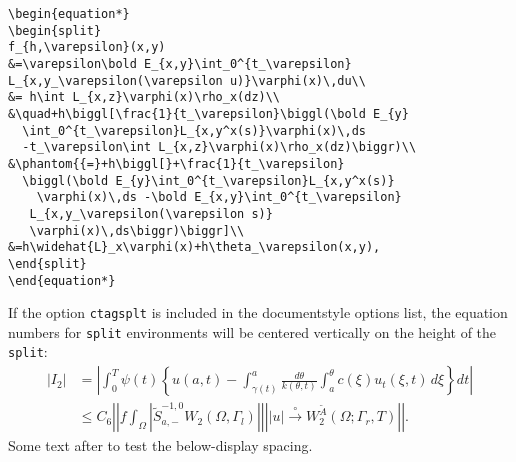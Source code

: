 \begin{verbatim}
\begin{equation*}
\begin{split}
f_{h,\varepsilon}(x,y)
&=\varepsilon\bold E_{x,y}\int_0^{t_\varepsilon}
L_{x,y_\varepsilon(\varepsilon u)}\varphi(x)\,du\\
&= h\int L_{x,z}\varphi(x)\rho_x(dz)\\
&\quad+h\biggl[\frac{1}{t_\varepsilon}\biggl(\bold E_{y}
  \int_0^{t_\varepsilon}L_{x,y^x(s)}\varphi(x)\,ds
  -t_\varepsilon\int L_{x,z}\varphi(x)\rho_x(dz)\biggr)\\
&\phantom{{=}+h\biggl[}+\frac{1}{t_\varepsilon}
  \biggl(\bold E_{y}\int_0^{t_\varepsilon}L_{x,y^x(s)}
    \varphi(x)\,ds -\bold E_{x,y}\int_0^{t_\varepsilon}
   L_{x,y_\varepsilon(\varepsilon s)}
   \varphi(x)\,ds\biggr)\biggr]\\
&=h\widehat{L}_x\varphi(x)+h\theta_\varepsilon(x,y),
\end{split}
\end{equation*}
\end{verbatim}

\newpage
If the option {\tt ctagsplt} is included in the documentstyle options
list, the equation numbers for {\tt split} environments will be
centered vertically on the height
of  the {\tt split}:
{\makeatletter\ctagsplit@true
\begin{equation}
\begin{split}
 |I_2|&=\left|\int_{0}^T \psi(t)\left\{u(a,t)-\int_{\gamma(t)}^a
  \frac{d\theta}{k(\theta,t)}
  \int_{a}^\theta c(\xi)u_t(\xi,t)\,d\xi\right\}dt\right|\\
&\le C_6\left|\left|f\int_\Omega\left|\widetilde{S}^{-1,0}_{a,-}
  W_2(\Omega,\Gamma_l)\right|\right|
  \left||u|\overset{\circ}\to W_2^{\widetilde{A}}
  (\Omega;\Gamma_r,T)\right|\right|.
\end{split}
\end{equation}}%
Some text after to test the below-display spacing.


